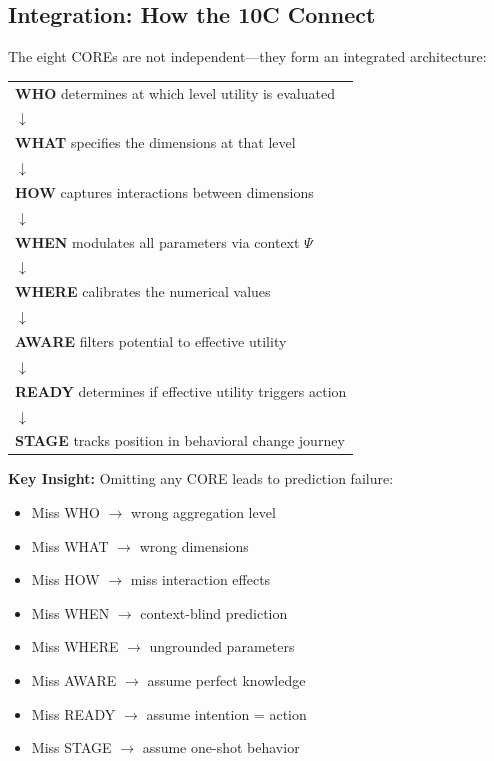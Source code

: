 \subsection{Integration: How the 10C Connect}
\label{sec:10c-integration}

The eight COREs are not independent---they form an integrated architecture:

\begin{tcolorbox}[colback=green!5!white, colframe=green!75!black,
    title=\textbf{The 10C Integration Structure}]

\begin{center}
\begin{tabular}{@{}l@{}}
\textbf{WHO} determines at which level utility is evaluated \\
$\downarrow$ \\
\textbf{WHAT} specifies the dimensions at that level \\
$\downarrow$ \\
\textbf{HOW} captures interactions between dimensions \\
$\downarrow$ \\
\textbf{WHEN} modulates all parameters via context $\Psi$ \\
$\downarrow$ \\
\textbf{WHERE} calibrates the numerical values \\
$\downarrow$ \\
\textbf{AWARE} filters potential to effective utility \\
$\downarrow$ \\
\textbf{READY} determines if effective utility triggers action \\
$\downarrow$ \\
\textbf{STAGE} tracks position in behavioral change journey \\
\end{tabular}
\end{center}

\textbf{Key Insight:} Omitting any CORE leads to prediction failure:
\begin{itemize}[nosep]
\item Miss WHO $\rightarrow$ wrong aggregation level
\item Miss WHAT $\rightarrow$ wrong dimensions
\item Miss HOW $\rightarrow$ miss interaction effects
\item Miss WHEN $\rightarrow$ context-blind prediction
\item Miss WHERE $\rightarrow$ ungrounded parameters
\item Miss AWARE $\rightarrow$ assume perfect knowledge
\item Miss READY $\rightarrow$ assume intention = action
\item Miss STAGE $\rightarrow$ assume one-shot behavior
\end{itemize}

\end{tcolorbox}

